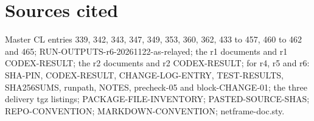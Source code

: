 \documentclass[10pt]{article}
\begin{document}
\section{Sources cited}

Master CL entries 339, 342, 343, 347, 349, 353, 360, 362, 433 to 457, 460 to 462 and 465; RUN-OUTPUTS-r6-20261122-as-relayed; the r1 documents and r1 CODEX-RESULT; the r2 documents and r2 CODEX-RESULT; for r4, r5 and r6: SHA-PIN, CODEX-RESULT, CHANGE-LOG-ENTRY, TEST-RESULTS, SHA256SUMS, runpath, NOTES, precheck-05 and block-CHANGE-01; the three delivery tgz listings; PACKAGE-FILE-INVENTORY; PASTED-SOURCE-SHAS; REPO-CONVENTION; MARKDOWN-CONVENTION; netframe-doc.sty.
\end{document}
